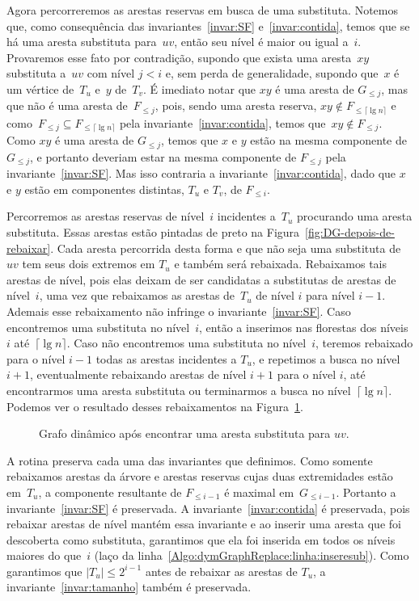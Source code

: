 Agora percorreremos as arestas reservas em busca de uma substituta. Notemos que, como consequência das invariantes~\ref{invar:SF} e~\ref{invar:contida}, temos que se há uma aresta substituta para~$uv$, então seu nível é maior ou igual a~$i$. Provaremos esse fato por contradição, supondo que exista uma aresta~$xy$ substituta a~$uv$ com nível $j<i$ e, sem perda de generalidade, supondo que~$x$ é um vértice de~$T_u$ e~$y$ de~$T_v$. É imediato notar que $xy$ é uma aresta de $G_{\leqslant j}$, mas que não é uma aresta de~$F_{\leqslant j}$, pois, sendo uma aresta reserva, $xy\notin F_{\leqslant \lceil \lg n \rceil}$ e como~$F_{\leqslant j} \subseteq F_{\leqslant \lceil \lg n \rceil}$  pela invariante~\ref{invar:contida}, temos que~$xy\notin F_{\leqslant j}$. Como $xy$ é uma aresta de $G_{\leqslant j}$, temos que $x$ e $y$ estão na mesma componente de $G_{\leqslant j}$, e portanto deveriam estar na mesma componente de $F_{\leqslant j}$ pela invariante~\ref{invar:SF}. Mas isso contraria a invariante~\ref{invar:contida}, dado que $x$ e $y$ estão em componentes distintas, $T_u$ e $T_v$, de $F_{\leqslant i}$.

Percorremos as arestas reservas de nível~$i$ incidentes a~$T_u$ procurando uma aresta substituta. Essas arestas estão pintadas de preto na Figura~\ref{fig:DG-depois-de-rebaixar}. Cada aresta percorrida desta forma e que não seja uma substituta de~$uv$ tem seus dois extremos em $T_u$ e também será rebaixada.
Rebaixamos tais arestas de nível, pois elas deixam de ser candidatas a substitutas de arestas de nível~$i$, uma vez que rebaixamos as arestas de~$T_u$ de nível $i$ para nível $i-1$. 
Ademais esse rebaixamento não infringe o invariante~\ref{invar:SF}.
Caso encontremos uma substituta no nível~$i$, então a inserimos nas florestas dos níveis~$i$ até~$\lceil \lg n \rceil$. Caso não encontremos uma substituta no nível~$i$, teremos rebaixado para o nível $i-1$ todas as arestas incidentes a $T_u$, e repetimos a busca no nível~$i+1$, eventualmente rebaixando arestas de nível $i+1$ para o nível $i$, até encontrarmos uma aresta substituta ou terminarmos a busca no nível~$\lceil \lg n \rceil$. Podemos ver o resultado desses rebaixamentos na Figura~\ref{fig:DG-depois-achou-sub}.
\begin{figure}[htb]
\centering
\caption{Grafo dinâmico após encontrar uma aresta substituta para $uv$.}
\label{fig:DG-depois-achou-sub}
\end{figure}

A rotina \dymGraphReplace{} preserva cada uma das invariantes que definimos. 
Como somente rebaixamos arestas da árvore e arestas reservas cujas duas extremidades estão em~$T_u$, a componente resultante de $F_{\leqslant i-1}$ é maximal em~$G_{\leqslant i-1}$. Portanto a invariante~\ref{invar:SF} é preservada.
A invariante~\ref{invar:contida} é preservada, pois rebaixar arestas de nível mantém essa invariante e ao inserir uma aresta que foi descoberta como substituta, garantimos que ela foi inserida em todos os níveis maiores do que~$i$ (laço da linha~\ref{Algo:dymGraphReplace:linha:inseresub}).  
Como garantimos que $|T_u| \leqslant 2^{i-1}$ antes de rebaixar as arestas de $T_u$, a invariante~\ref{invar:tamanho} também é preservada.

